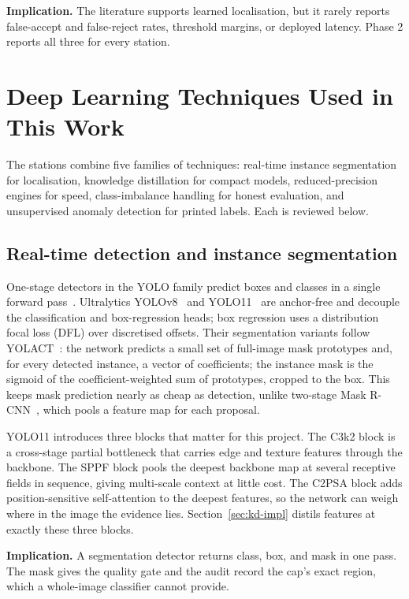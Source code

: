 \noindent\textbf{Implication.} The literature supports learned localisation, but it rarely reports false-accept and false-reject rates, threshold margins, or deployed latency. Phase 2 reports all three for every station.

\section{Deep Learning Techniques Used in This Work}
\label{sec:lit-techniques}
The stations combine five families of techniques: real-time instance segmentation for localisation, knowledge distillation for compact models, reduced-precision engines for speed, class-imbalance handling for honest evaluation, and unsupervised anomaly detection for printed labels. Each is reviewed below.

\subsection{Real-time detection and instance segmentation}
\label{sec:lit-seg}

One-stage detectors in the YOLO family predict boxes and classes in a single forward pass~\cite{redmon2016}. Ultralytics YOLOv8~\cite{jocher2023} and YOLO11~\cite{jocher2024} are anchor-free and decouple the classification and box-regression heads; box regression uses a distribution focal loss (DFL) over discretised offsets. Their segmentation variants follow YOLACT~\cite{bolya2019}: the network predicts a small set of full-image mask prototypes and, for every detected instance, a vector of coefficients; the instance mask is the sigmoid of the coefficient-weighted sum of prototypes, cropped to the box. This keeps mask prediction nearly as cheap as detection, unlike two-stage Mask R-CNN~\cite{he2017maskrcnn}, which pools a feature map for each proposal.

YOLO11 introduces three blocks that matter for this project. The C3k2 block is a cross-stage partial bottleneck that carries edge and texture features through the backbone. The SPPF block pools the deepest backbone map at several receptive fields in sequence, giving multi-scale context at little cost. The C2PSA block adds position-sensitive self-attention to the deepest features, so the network can weigh where in the image the evidence lies. Section~\ref{sec:kd-impl} distils features at exactly these three blocks.

\noindent\textbf{Implication.} A segmentation detector returns class, box, and mask in one pass. The mask gives the quality gate and the audit record the cap's exact region, which a whole-image classifier cannot provide.

